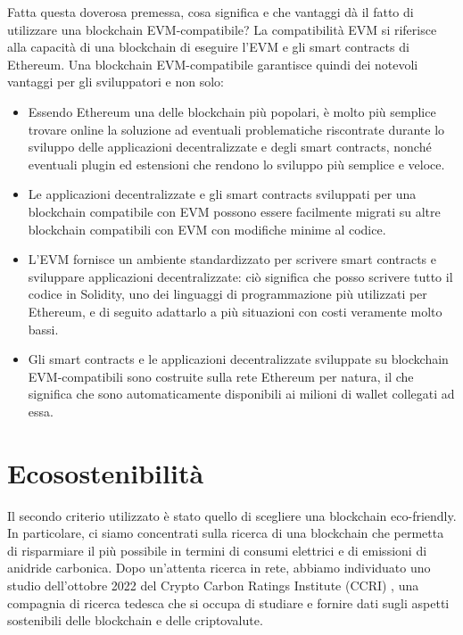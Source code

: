 \documentclass[12pt]{report}
\begin{document}
\noindent
Fatta questa doverosa premessa, cosa significa e che vantaggi dà il fatto di utilizzare una blockchain EVM-compatibile?\newline
La compatibilità EVM si riferisce alla capacità di una blockchain di eseguire l'EVM e gli smart contracts di Ethereum. Una blockchain EVM-compatibile garantisce quindi dei notevoli vantaggi per gli sviluppatori e non solo:
\begin{itemize}[topsep=5pt, itemsep=0pt]
    \item Essendo Ethereum una delle blockchain più popolari, è molto più semplice trovare online la soluzione ad eventuali problematiche riscontrate durante lo sviluppo delle applicazioni decentralizzate e degli smart contracts, nonché eventuali plugin ed estensioni che rendono lo sviluppo più semplice e veloce.
    \item Le applicazioni decentralizzate e gli smart contracts sviluppati per una blockchain compatibile con EVM possono essere facilmente migrati su altre blockchain compatibili con EVM con modifiche minime al codice.
    \item L'EVM fornisce un ambiente standardizzato per scrivere smart contracts e sviluppare applicazioni decentralizzate: ciò significa che posso scrivere tutto il codice in Solidity, uno dei linguaggi di programmazione più utilizzati per Ethereum, e di seguito adattarlo a più situazioni con costi veramente molto bassi.
    \item Gli smart contracts e le applicazioni decentralizzate sviluppate su blockchain EVM-compatibili sono costruite sulla rete Ethereum per natura, il che significa che sono automaticamente disponibili ai milioni di wallet collegati ad essa. \cite{Dodici}
\end{itemize}

\section{Ecosostenibilità}
Il secondo criterio utilizzato è stato quello di scegliere una blockchain eco-friendly. In particolare, ci siamo concentrati sulla ricerca di una blockchain che permetta di risparmiare il più possibile in termini di consumi elettrici e di emissioni di anidride carbonica. Dopo un'attenta ricerca in rete, abbiamo individuato uno studio dell'ottobre 2022 del Crypto Carbon Ratings Institute (CCRI) \cite{Tredici}, una compagnia di ricerca tedesca che si occupa di studiare e fornire dati sugli aspetti sostenibili delle blockchain e delle criptovalute.
\end{document}
